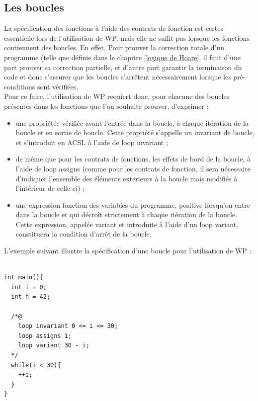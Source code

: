 
\subsection{Les boucles}\label{Boucles WP}

La spécification des fonctions à l'aide des contrats de fonction est certes essentielle lors de l'utilisation de WP, mais elle ne suffit pas lorsque les fonctions contiennent des boucles. En effet, Pour prouver la correction totale d’un programme (telle que définie dans le chapitre \ref{logique de Hoare}, il faut d’une part prouver sa correction partielle, et d’autre part garantir la terminaison du code et donc s’assurer que les boucles s’arrêtent nécessairement lorsque les pré-conditions sont vérifiées.
\\
\noindent
Pour ce faire, l'utilisation de WP requiert donc, pour chacune des boucles présentes dans les fonctions que l'on souhaite prouver, d'exprimer :

\begin{itemize}
	\item une propriétée vérifiée avant l'entrée dans la boucle, à chaque itération de la boucle et en sortie de boucle. Cette propriété s'appelle un invariant de boucle, et s'introduit en ACSL à l'aide de loop invariant ;
	\item de même que pour les contrats de fonctions, les effets de bord de la boucle, à l'aide de loop assigns (comme pour les contrats de fonction, il sera nécessaire d'indiquer l'ensemble des éléments exterieurs à la boucle mais modifiés à l'intérieur de celle-ci) ;
	\item une expression fonction des variables du programme, positive lorsqu’on entre dans la boucle et qui décroît strictement à chaque itération de la boucle. Cette expression, appelée variant et introduite à l'aide d'un loop variant, constituera la condition d'arrêt de la boucle.

\end{itemize}

\noindent L'exemple suivant illustre la spécification d'une boucle pour l'utilisation de WP :

\begin{lstlisting}

int main(){
  int i = 0;
  int h = 42;

  /*@
    loop invariant 0 <= i <= 30;
    loop assigns i;
    loop variant 30 - i;
  */
  while(i < 30){
    ++i;
  }
}
\end{lstlisting}

